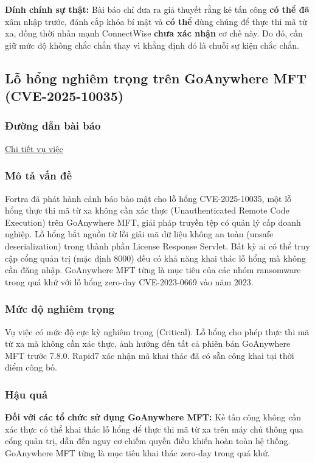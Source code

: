 \textbf{Đính chính sự thật:}
Bài báo chỉ đưa ra giả thuyết rằng kẻ tấn công \textbf{có thể đã} xâm nhập trước, đánh cắp khóa bí mật và \textbf{có thể} dùng chúng để thực thi mã từ xa, đồng thời nhấn mạnh ConnectWise \textbf{chưa xác nhận} cơ chế này. Do đó, cần giữ mức độ không chắc chắn thay vì khẳng định đó là chuỗi sự kiện chắc chắn.
\subsection{Lỗ hổng nghiêm trọng trên GoAnywhere MFT (CVE-2025-10035)}

\subsubsection{Đường dẫn bài báo}
\href{https://www.rapid7.com/blog/post/2025/09/18/etr-critical-unauthenticated-rce-in-fortra-goanywhere-mft/}{Chi tiết vụ việc}

\subsubsection{Mô tả vấn đề}
Fortra đã phát hành cảnh báo bảo mật cho lỗ hổng CVE-2025-10035, một lỗ hổng thực thi mã từ xa không cần xác thực (Unauthenticated Remote Code Execution) trên GoAnywhere MFT, giải pháp truyền tệp có quản lý cấp doanh nghiệp. Lỗ hổng bắt nguồn từ lỗi giải mã dữ liệu không an toàn (unsafe deserialization) trong thành phần License Response Servlet. Bất kỳ ai có thể truy cập cổng quản trị (mặc định 8000) đều có khả năng khai thác lỗ hổng mà không cần đăng nhập. GoAnywhere MFT từng là mục tiêu của các nhóm ransomware trong quá khứ với lỗ hổng zero-day CVE-2023-0669 vào năm 2023.

\subsubsection{Mức độ nghiêm trọng}
Vụ việc có mức độ cực kỳ nghiêm trọng (Critical). Lỗ hổng cho phép thực thi mã từ xa mà không cần xác thực, ảnh hưởng đến tất cả phiên bản GoAnywhere MFT trước 7.8.0. Rapid7 xác nhận mã khai thác đã có sẵn công khai tại thời điểm công bố.

\subsubsection{Hậu quả}
\textbf{Đối với các tổ chức sử dụng GoAnywhere MFT:} Kẻ tấn công không cần xác thực có thể khai thác lỗ hổng để thực thi mã từ xa trên máy chủ thông qua cổng quản trị, dẫn đến nguy cơ chiếm quyền điều khiển hoàn toàn hệ thống. GoAnywhere MFT từng là mục tiêu khai thác zero-day trong quá khứ.

